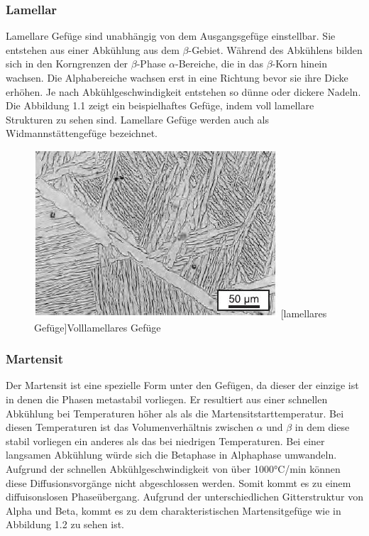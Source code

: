 \documentclass[a4paper, 11pt]{tubsreprt}
\begin{document}
\subsubsection{Lamellar}
Lamellare Gefüge sind unabhängig von dem Ausgangsgefüge einstellbar. Sie entstehen aus einer Abkühlung aus dem $\beta$-Gebiet. Während des Abkühlens bilden sich in den Korngrenzen der $\beta$-Phase $\alpha$-Bereiche, die in das $\beta$-Korn hinein wachsen. Die Alphabereiche wachsen erst in eine Richtung bevor sie ihre Dicke erhöhen. Je nach Abkühlgeschwindigkeit entstehen so dünne oder dickere Nadeln. Die Abbildung 1.1 zeigt ein beispielhaftes Gefüge, indem voll lamellare Strukturen zu sehen sind. Lamellare Gefüge werden auch als Widmannstättengefüge bezeichnet. 


\begin{figure}


	\centering
		\includegraphics[scale=1]{Bilder/lamellar.jpg}
		[lamellares Gefüge]{Volllamellares Gefüge \cite{Leyens2002}}
		\label{fig1}
		
\end{figure}
\subsubsection{Martensit}
Der Martensit ist eine spezielle Form unter den Gefügen, da dieser der einzige ist in denen die Phasen metastabil vorliegen. Er resultiert aus einer schnellen Abkühlung bei Temperaturen höher als als die Martensitstarttemperatur. Bei diesen Temperaturen ist das Volumenverhältnis zwischen $\alpha$ und $\beta$ in dem diese stabil vorliegen ein anderes als das bei niedrigen Temperaturen. Bei einer langsamen Abkühlung würde sich die Betaphase in Alphaphase umwandeln. Aufgrund der schnellen Abkühlgeschwindigkeit von über 1000°C/min können diese Diffusionsvorgänge nicht abgeschlossen werden. Somit kommt es zu einem diffuisonslosen Phaseübergang. Aufgrund der unterschiedlichen Gitterstruktur von Alpha und Beta, kommt es zu dem charakteristischen Martensitgefüge wie in Abbildung 1.2 zu sehen ist.
\end{document}
